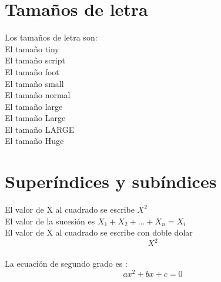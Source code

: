 \documentclass[10pt,a4paper]{book}
\begin{document}
\section{Tamaños de letra}
	Los tamaños de letra son: \\
	{\tiny El tamaño tiny} \\
	{\scripsize  El tamaño script} \\
	{\footnotesize El tamaño foot} \\
	{\small El tamaño small} \\
	{\normalsize El tamaño normal} \\
	{\large El tamaño large} \\
	{\Large El tamaño Large} \\
	{\LARGE El tamaño LARGE} \\
	{\Huge El tamaño  Huge} \\
	
\section{Superíndices y subíndices}
	El valor de X al cuadrado se escribe $ X^2 $ \\
	El valor de la sucesión es $ X_1 + X_2 + ... + X_n= X_i $ \\
	El valor de X al cuadrado se escribe con doble dolar $$ X^2 $$ \\
	La ecuación de segundo grado es : $$ ax^2 +bx +c = 0 $$
\end{document}
